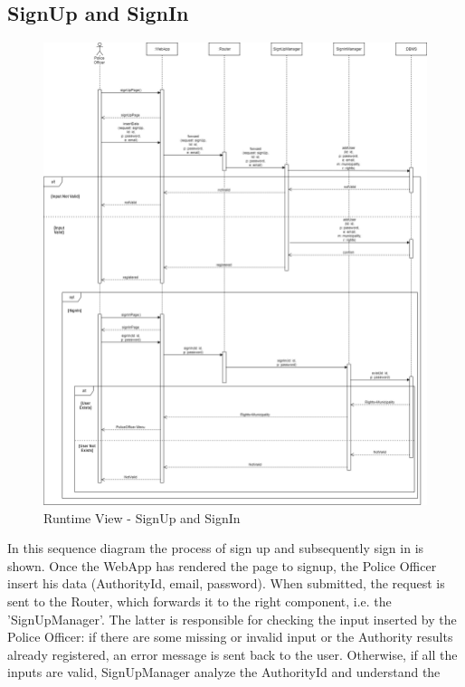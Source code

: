        \subsection{SignUp and SignIn}
        \begin{figure}[H]
            \includegraphics[scale=0.35]{dd/resources/images/RuntimeView-SignUp+SignIn}
            \caption{Runtime View - SignUp and SignIn}        
        \end{figure}
        In this sequence diagram the process of sign up and subsequently sign in
        is shown. Once the WebApp has rendered the page to signup, the Police
        Officer insert his data (AuthorityId, email, password). When submitted,
        the request is sent to the Router, which forwards it to the right
        component, i.e. the 'SignUpManager'. The latter is responsible for
        checking the input inserted by the Police Officer: if there are some
        missing or invalid input or the Authority results already registered, an
        error message is sent back to the user. Otherwise, if all the inputs are
        valid, SignUpManager analyze the AuthorityId and understand the
